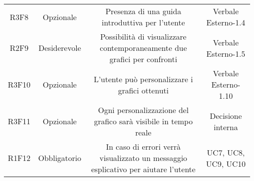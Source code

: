 \begin{center}
\begin{longtable}{C{\colA} C{\colB} C{\colC} C{\colA}}
R3F8 & Opzionale & Presenza di una guida introduttiva per l'utente & Verbale Esterno-1.4\\
R2F9 & Desiderevole & Possibilità di visualizzare contemporaneamente due grafici per confronti & Verbale Esterno-1.5\\
R3F10 & Opzionale & L'utente può personalizzare i grafici ottenuti & Verbale Esterno-1.10 \\
R3F11 & Opzionale & Ogni personalizzazione del grafico sarà visibile in tempo reale & Decisione interna \\
R1F12 & Obbligatorio & In caso di errori verrà visualizzato un messaggio esplicativo per aiutare l'utente & UC7, UC8, UC9, UC10\\

\end{longtable}
\end{center}



